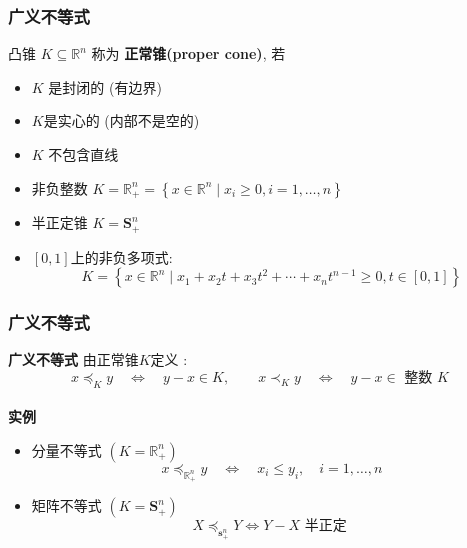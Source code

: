 \documentclass[handout]{beamer}
\begin{document}
\begin{frame}
\frametitle{广义不等式}

凸锥 $K \subseteq \mathbb{R}^{n}$ 称为 \textbf{正常锥(proper cone)}, 若 
\begin{itemize}
	\item $K$ 是封闭的 (有边界)
	\item $K$是实心的 (内部不是空的)
	\item $K$ 不包含直线 
\end{itemize}



\begin{itemize}
	\item<2-> 非负整数 $K=\mathbb{R}_{+}^{n}=\left\{x \in \mathbb{R}^{n} \mid x_{i} \geq 0, i=1, \ldots, n\right\}$
	\item<3-> 半正定锥 $K=\mathbf{S}_{+}^{n}$
	\item<4->  
	$[0,1]$上的非负多项式:
	\begin{equation}
		K=\left\{x \in \mathbb{R}^{n} \mid x_{1}+x_{2} t+x_{3} t^{2}+\cdots+x_{n} t^{n-1} \geq 0,  t \in[0,1]\right\}
	\end{equation}
\end{itemize}
\end{frame}
\begin{frame}
	\frametitle{广义不等式}
	\textbf{广义不等式} 由正常锥$K$定义 :
\begin{equation}
	x \preceq_{K} y \quad \Longleftrightarrow \quad y-x \in K, \quad \quad x \prec_{K} y \quad \Longleftrightarrow \quad y-x \in \textbf { 整数 } K
\end{equation}\\
\bigskip
\textbf{实例}
\begin{itemize}
	\item<2-> 分量不等式 $\left(K=\mathbb{R}_{+}^{n}\right)$
    \begin{equation}
    	x \preceq_{\mathbb{R}_{+}^{n}} y \quad \Longleftrightarrow \quad x_{i} \leq y_{i}, \quad i=1, \ldots, n
    \end{equation}
    \item<3-> 矩阵不等式 $\left(K=\mathbf{S}_{+}^{n}\right)$
    \begin{equation}
    	X \preceq_{\mathbf{s}_{+}^{n}} Y \Longleftrightarrow Y-X \text { 半正定 }
    \end{equation}
\end{itemize}
\bigskip
{}
\end{frame}
\end{document}
